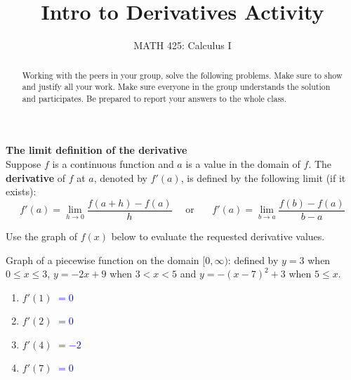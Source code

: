 \documentclass{ximera}
\title{Intro to Derivatives Activity}
\author{MATH 425: Calculus I}
\begin{document}
\begin{abstract}
    Working with the peers in your group, solve the following problems. Make sure to show and justify all your work. Make sure everyone in the group understands the solution and participates. Be prepared to report your answers to the whole class. 
\end{abstract}
\maketitle

\begin{definition}
        \textbf{The limit definition of the derivative}\\
        Suppose $f$ is a continuous function and $a$ is a value in the domain of $f$. The \textbf{derivative} of $f$ at $a$, denoted by $f'(a)$, is defined by the following limit (if it exists):
        $$f'(a)=\lim_{h\rightarrow 0}\frac{f(a+h)-f(a)}{h}\,\,\,\,\,\,\,\,\text{or}\,\,\,\,\,\,\,\,\,\,\,f'(a)=\lim_{b\rightarrow a}\frac{f(b)-f(a)}{b-a}$$
\end{definition}

\begin{exercise}
    Use the graph of $f(x)$ below to evaluate the requested derivative values.
    \begin{image}
    \end{image}
    \xmalt Graph of a piecewise function on the domain $[0,\infty)$: defined by $y=3$ when $0\leq x\leq 3$, $y=-2x+9$ when $3<x<5$ and $y=-(x-7)^2+3$ when $5\leq x$.
    \begin{enumerate}
        \item $f'(1)$ \textcolor{blue}{$=0$}
        \item $f'(2)$ \textcolor{blue}{$=0$}
        \item $f'(4)$ \textcolor{blue}{$=-2$}
        \item $f'(7)$ \textcolor{blue}{$=0$}
    \end{enumerate}
\end{exercise}
\end{document}
